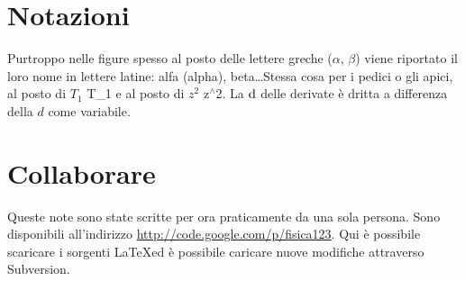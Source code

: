 \section*{\centering Notazioni}
Purtroppo nelle figure spesso al posto delle lettere greche ($\alpha$, $\beta$) viene riportato il loro nome in lettere latine: alfa (alpha), beta\ldots Stessa cosa per i pedici o gli apici, al posto di $T_1$ T\_1 e al posto di $z^2$ z$^\wedge$2. La $\mathrm{d}$ delle derivate è dritta a differenza della $d$ come variabile.
\newpage
\section*{\centering Collaborare}
Queste note sono state scritte per ora praticamente da una sola persona. Sono disponibili all'indirizzo \href{http://code.google.com/p/fisica123}{http://code.google.com/p/fisica123}. Qui è possibile scaricare i sorgenti \LaTeX ed è possibile caricare nuove modifiche attraverso Subversion.

\rmfamily\upshape